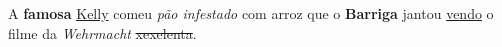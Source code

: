 \begin{center}
    A \textbf{famosa} \underline{Kelly} comeu \textit{pão infestado}
    com arroz que o \textbf{Barriga} jantou \underline{vendo} o
    filme da \textit{Wehrmacht} \sout{xexelenta}.
\end{center}
